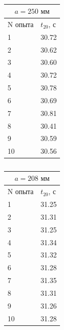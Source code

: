\documentclass[a4paper]{article}
\begin{document}
\begin{itemize}
\begin{table}
\begin{minipage}{0.32\linewidth}
\centering
\begin{tabular}{|l|l|}
\hline
\multicolumn{2}{|c|}{$a = 250 \text{ мм}$} \\
\hline
N опыта & $t_{20}$, с  \\
\hline
1       & 30.72             \\
\hline
2       & 30.62             \\
\hline
3       & 30.60           \\
\hline
4       & 30.72             \\
\hline
5       & 30.78             \\
\hline
6       & 30.69             \\
\hline
7       & 30.81           \\
\hline
8       & 30.41           \\
\hline
9       & 30.59            \\
\hline
10      & 30.56     \\
\hline       
\end{tabular}
\caption{}
\end{minipage}
\begin{minipage}{0.32\linewidth}
\centering
\begin{tabular}{|l|l|}
\hline
\multicolumn{2}{|c|}{$a = 208 \text{ мм}$} \\
\hline
N опыта & $t_{20}$, с  \\
\hline
1       &   31.25          \\
\hline
2       &   31.31             \\
\hline
3       &   31.25           \\
\hline
4       &   31.34            \\
\hline
5       &   31.32           \\
\hline
6       &   31.28             \\
\hline
7       &   31.35         \\
\hline
8       &   31.31             \\
\hline
9       &   31.26             \\
\hline
10      &   31.28    \\
\hline       
\end{tabular}
\caption{}
\end{minipage}
\begin{minipage}{0.32\linewidth}
\centering
\begin{tabular}{|l|l|}

\end{tabular}
\end{minipage}
\end{table}
\end{itemize}
\end{document}
